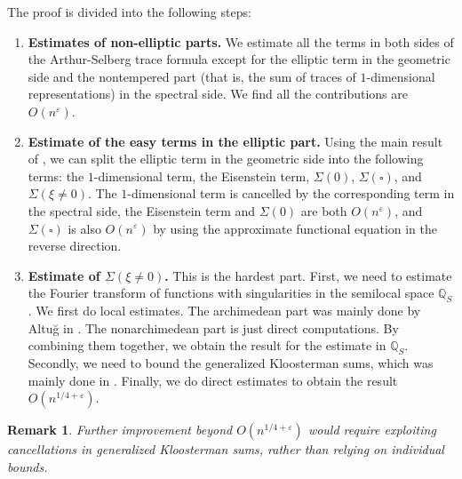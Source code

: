 \documentclass[10pt,oneside,reqno]{amsart}
\newcommand\QQ{\mathbb{Q}}
\theoremstyle{THEOREM}
\theoremstyle{DEFINITION}
\theoremstyle{EXERCISE}
\newtheorem{remark}[theorem]{Remark}
\numberwithin{equation}{section}
\begin{document}
The proof is divided into the following steps:
\begin{enumerate}[itemsep=0pt,parsep=0pt,topsep=0pt,leftmargin=0pt,labelsep=3pt,itemindent=9pt,label=\textbullet]
  \item \textbf{Estimates of non-elliptic parts.} We estimate all the terms in both sides of the Arthur-Selberg trace formula except for the elliptic term in the geometric side and the nontempered part (that is, the sum of traces of $1$-dimensional representations) in the spectral side. We find all the contributions are $O(n^\varepsilon)$.
  \item \textbf{Estimate of the easy terms in the elliptic part.}  Using the main result of \cite{cheng2025}, we can split the elliptic term in the geometric side into the following terms: the $1$-dimensional term, the Eisenstein term, $\Sigma(0)$, $\Sigma(\square)$, and $\Sigma(\xi\neq 0)$. The $1$-dimensional term is cancelled by the corresponding term in the spectral side, the Eisenstein term and $\Sigma(0)$ are both $O(n^\varepsilon)$, and $\Sigma(\square)$ is also $O(n^\varepsilon)$ by using the approximate functional equation in the reverse direction.
  \item \textbf{Estimate of $\Sigma(\xi\neq 0)$.} This is the hardest part. First, we need to estimate the Fourier transform of functions with singularities in the semilocal space $\QQ_S$. We first do local estimates. The archimedean part was mainly done by Altu\u{g} in \cite{altug2017}. The nonarchimedean part is just direct computations. By combining them together, we obtain the result for the estimate in $\QQ_S$. Secondly, we need to bound the generalized Kloosterman sums, which was mainly done in \cite{altug2017}. Finally, we do direct estimates to obtain the result $O(n^{1/4+\varepsilon})$.
\end{enumerate}

\begin{remark}
Further improvement beyond $O(n^{1/4+\varepsilon})$ would require exploiting cancellations in generalized Kloosterman sums, rather than relying on individual bounds.
\end{remark}
\end{document}
